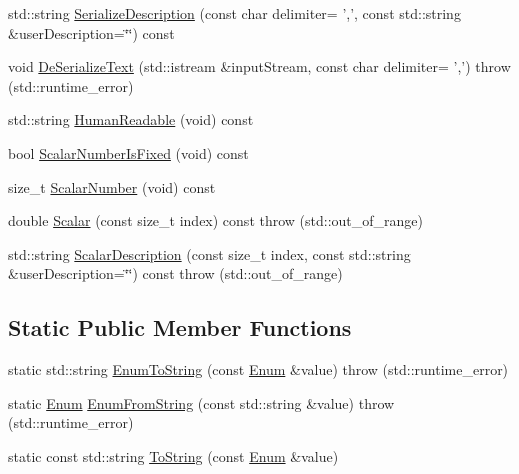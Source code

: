\begin{DoxyCompactItemize}
\item 
std\-::string \hyperlink{classmts_execution_result_a86f2f2d55405d3f0757c73cc0ce357bc}{Serialize\-Description} (const char delimiter= ',', const std\-::string \&user\-Description=\char`\"{}\char`\"{}) const 
\item 
void \hyperlink{classmts_execution_result_a77d1ac94cc196622ca7ccdd18f94a325}{De\-Serialize\-Text} (std\-::istream \&input\-Stream, const char delimiter= ',')  throw (std\-::runtime\-\_\-error)
\item 
std\-::string \hyperlink{classmts_execution_result_a7da5643e1f3d0c7f3d2005f0a02cd949}{Human\-Readable} (void) const 
\item 
bool \hyperlink{classmts_execution_result_a9d85e84986980f0cc17ca1b21238ddc7}{Scalar\-Number\-Is\-Fixed} (void) const 
\item 
size\-\_\-t \hyperlink{classmts_execution_result_a0d358fff33fc164bb66f8b55466148aa}{Scalar\-Number} (void) const 
\item 
double \hyperlink{classmts_execution_result_adfb34190b3ade19b642bfa7e836c4fc1}{Scalar} (const size\-\_\-t index) const   throw (std\-::out\-\_\-of\-\_\-range)
\item 
std\-::string \hyperlink{classmts_execution_result_a47b0cd05aa5033e1fe1283dc9d07a38a}{Scalar\-Description} (const size\-\_\-t index, const std\-::string \&user\-Description=\char`\"{}\char`\"{}) const   throw (std\-::out\-\_\-of\-\_\-range)
\end{DoxyCompactItemize}
\subsection*{Static Public Member Functions}
\begin{DoxyCompactItemize}
\item 
static std\-::string \hyperlink{classmts_execution_result_a762299c8990bcf0a3bead93bce52fb3f}{Enum\-To\-String} (const \hyperlink{classmts_execution_result_a10c4246c82ac99d88e5f716f79407b77}{Enum} \&value)  throw (std\-::runtime\-\_\-error)
\item 
static \hyperlink{classmts_execution_result_a10c4246c82ac99d88e5f716f79407b77}{Enum} \hyperlink{classmts_execution_result_a57ae921040a5ce5f378828998452e41c}{Enum\-From\-String} (const std\-::string \&value)  throw (std\-::runtime\-\_\-error)
\item 
static const std\-::string \hyperlink{classmts_execution_result_a3144e8062681b756fa5f55449d02ae33}{To\-String} (const \hyperlink{classmts_execution_result_a10c4246c82ac99d88e5f716f79407b77}{Enum} \&value)
\end{DoxyCompactItemize}
